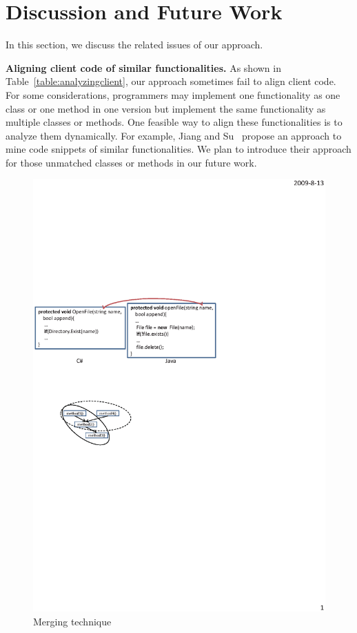 \section{Discussion and Future Work}
\label{sec:discuss} In this section, we discuss the related issues
of our approach.

\textbf{Aligning client code of similar functionalities.} As shown
in Table~\ref{table:analyzingclient}, our approach sometimes fail to
align client code. For some considerations, programmers may
implement one functionality as one class or one method in one
version but implement the same functionality as multiple classes or
methods. One feasible way to align these functionalities is to
analyze them dynamically. For example, Jiang and
Su~\cite{jiang2009automatic} propose an approach to mine code
snippets of similar functionalities. We plan to introduce their
approach for those unmatched classes or methods in our future work.
\begin{figure}[t]
\centering
\includegraphics[scale=1,clip]{figure/n2n.eps}\vspace*{-3ex}
 \caption{Merging technique}\vspace*{-3.5ex}
 \label{fig:n2n}
\end{figure}


